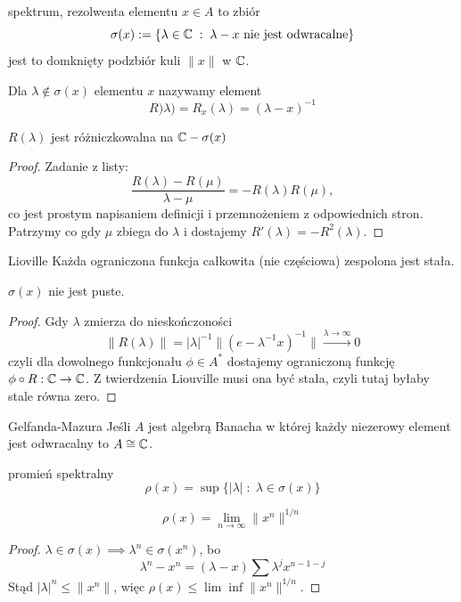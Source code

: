 \begin{definition}{spektrum, rezolwenta}{}
   elementu $x\in A$ to zbiór
  $$\sigma(x):=\{\lambda\in\mathbb{C}\;:\;\lambda-x\text{ nie jest odwracalne}\}$$
  jest to domknięty podzbiór kuli $\|x\|$ w $\mathbb{C}$.

  Dla $\lambda\not\in\sigma(x)$  elementu $x$ nazywamy element
  $$R)\lambda)=R_x(\lambda)=(\lambda-x)^{-1}$$
\end{definition}

\begin{lemma}{}{}
  $R(\lambda)$ jest różniczkowalna na $\mathbb{C}-\sigma(x)$
\end{lemma}

\begin{proof}
  Zadanie z listy: 
  $$\frac{R(\lambda)-R(\mu)}{\lambda-\mu}=-R(\lambda)R(\mu),$$
  co jest prostym napisaniem definicji i przemnożeniem z odpowiednich stron. Patrzymy co gdy $\mu$ zbiega do $\lambda$ i dostajemy $R'(\lambda)=-R^2(\lambda)$.
\end{proof}

\begin{theorem}{Lioville}{}
  Każda ograniczona funkcja całkowita (nie częściowa) zespolona jest stała.
\end{theorem}

\begin{proposition}{}{}
  $\sigma(x)$ nie jest puste.
\end{proposition}

\begin{proof}
  Gdy $\lambda$ zmierza do nieskończoności 
  $$\|R(\lambda)\|=|\lambda|^{-1}\|(e-\lambda^{-1}x)^{-1}\|\xrightarrow{\lambda\to\infty}0$$
  czyli dla dowolnego funkcjonału $\phi\in A^*$ dostajemy ograniczoną funkcję $\phi\circ R:\mathbb{C}\to \mathbb{C}$. Z twierdzenia Liouville musi ona być stała, czyli tutaj byłaby stale równa zero.
\end{proof}

\begin{theorem}{Gelfanda-Mazura}{}
  Jeśli $A$ jest algebrą Banacha w której każdy niezerowy element jest odwracalny to $A\cong \mathbb{C}$.
\end{theorem}

\begin{definition}{promień spektralny}{}
  $$\rho(x)=\sup\{|\lambda|\;:\;\lambda\in\sigma(x)\}$$
\end{definition}

\begin{theorem}{}{}
  $$\rho(x)=\lim_{n\to\infty}\|x^n\|^{1/n}$$
\end{theorem}

\begin{proof}
  $\lambda\in \sigma(x)\implies \lambda^n\in\sigma(x^n)$, bo 
  $$\lambda^n-x^n=(\lambda-x)\sum \lambda^jx^{n-1-j}$$
  Stąd $|\lambda|^n\leq \|x^n\|$, więc $\rho(x)\leq \lim\inf \|x^n\|^{1/n}$.
\end{proof}







